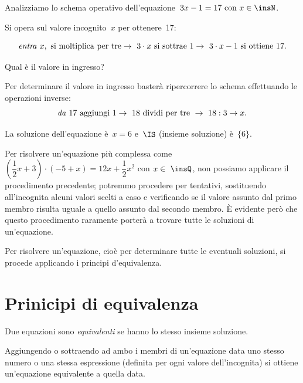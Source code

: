 \begin{exrig}
 \begin{esempio}
Analizziamo lo schema operativo dell'equazione~\(3x-1=17 \text{ con } x\in\insN\).

Si opera sul valore incognito~\(x\) per ottenere~17:

\[\text{\emph{entra} } x,\text{ si moltiplica per tre}\to~3\cdot x%
\text{ si sottrae } 1\to~3\cdot x-1 \text{ si ottiene } 17.\]

Qual è il valore in ingresso?

Per determinare il valore in ingresso basterà ripercorrere lo schema
 effettuando le operazioni inverse:
\[\text{\emph{da} } 17 \text{ aggiungi } 1\to~18 \text{ dividi per tre }\to~18:3 
\to x.\]

La soluzione dell'equazione è~\(x = 6\) e~\(\IS\) (insieme
soluzione) è~\(\{6\}\).
 \end{esempio}
\end{exrig}


Per risolvere un'equazione più complessa come
\(\left(\dfrac{1}{2}x+3\right)\cdot (-5+x)=12x+\dfrac{1}{2}x^{2}\) con
\(x\in~\insQ\), non possiamo applicare il procedimento precedente; potremmo
procedere per tentativi, sostituendo all'incognita
alcuni valori scelti a caso e verificando se il valore assunto dal
primo membro risulta uguale a quello assunto dal secondo membro. È
evidente però che questo procedimento raramente porterà a trovare
tutte le soluzioni di un'equazione.

\osservazione
Per risolvere un'equazione, cioè per determinare tutte
le eventuali soluzioni, si procede applicando i principi
d'equivalenza.

\section{Prinicipi di equivalenza}
\label{sec:13_principi}

\begin{definizione}
 Due equazioni sono \emph{equivalenti} se hanno lo stesso insieme soluzione.
\end{definizione}

\begin{principio}
 Aggiungendo o sottraendo ad ambo i membri di
un'equazione data uno stesso numero o una stessa
espressione (definita per ogni valore dell'incognita)
si ottiene un'equazione equivalente a quella data.
\end{principio}

